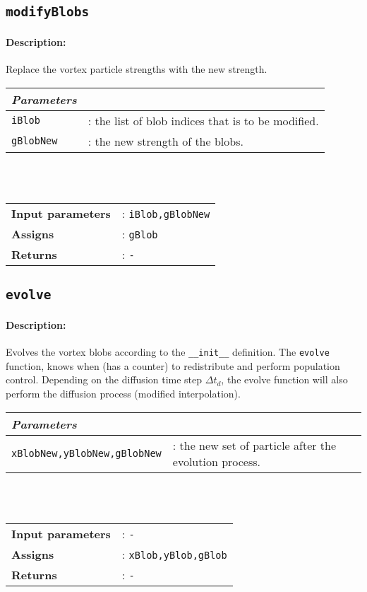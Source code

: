 	
\subsection{\texttt{modifyBlobs}}
	\paragraph{Description:} Replace the vortex particle strengths with the new strength.\\
	
	 \begin{tabular}{lp{10cm}}
				\textit{Parameters} & \\ \hline
		   		\texttt{iBlob} &: the list of blob indices that is to be modified.\\
		   		\texttt{gBlobNew} &: the new strength of the blobs.\\		   		
		\end{tabular} \vspace{5 mm}\\
	\\		
	\begin{tabular}{lp{10cm}}
		\textbf{Input parameters} &: \texttt{iBlob,gBlobNew}\\
		\textbf{Assigns} &: \texttt{gBlob}\\
		\textbf{Returns} &: \texttt{-}\\
	\end{tabular}	

\subsection{\texttt{evolve}}
	\paragraph{Description:} Evolves the vortex blobs according to the \texttt{\_\_init\_\_} definition. The \texttt{evolve} function, knows when (has a counter) to redistribute and perform population control. Depending on the diffusion time step $\Delta t_d$, the evolve function will also perform the diffusion process (modified interpolation).\\
	
	 \begin{tabular}{lp{10cm}}
				\textit{Parameters} & \\ \hline
		   		\texttt{xBlobNew,yBlobNew,gBlobNew} &: the new set of particle after the evolution process.\\
		\end{tabular} \vspace{5 mm}\\
	\\		
	\begin{tabular}{lp{10cm}}
		\textbf{Input parameters} &: \texttt{-}\\
		\textbf{Assigns} &: \texttt{xBlob,yBlob,gBlob}\\	
		\textbf{Returns} &: \texttt{-}\\
	\end{tabular}			


